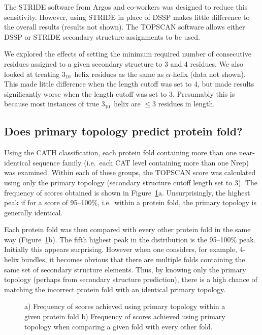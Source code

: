 \documentclass{article}
\newcommand{\htt}{\mbox{$3_{10}$}}
\begin{document}
The STRIDE software from Argos and co-workers was designed to reduce
this sensitivity. However, using STRIDE in place of DSSP makes little
difference to the overall results (results not shown). The TOPSCAN
software allows either DSSP or STRIDE secondary structure assignments
to be used.


We explored the effects of setting the minimum required number of
consecutive residues assigned to a given secondary structure to 3 and
4 residues. We also looked at treating \htt\ helix residues as the
same as $\alpha$-helix (data not shown). This made little difference
when the length cutoff was set to 4, but made results significantly
worse when the length cutoff was set to 3. Presumably this is because
most instances of true \htt\ helix are $\le 3$ residues in length.


\subsection{Does primary topology predict protein fold?}
Using the CATH classification, each protein fold containing more than
one near-identical sequence family (i.e.\ each CAT level containing
more than one Nrep) was examined. Within each of these groups, the
TOPSCAN score was calculated using only the primary topology
(secondary structure cutoff length set to 3). The frequency of scores
obtained is shown in Figure~\ref{fig:primary}a. Unsurprisingly, the
highest peak if for a score of 95--100\%, i.e.\ within a protein fold,
the primary topology is generally identical.

Each protein fold was then compared with every other protein fold in
the same way (Figure~\ref{fig:primary}b). The fifth highest peak in
the distribution is the 95--100\% peak. Initially this appears
surprising. However when one considers, for example, 4-helix bundles,
it becomes obvious that there are multiple folds containing the same
set of secondary structure elements. Thus, by knowing only the primary
topology (perhaps from secondary structure prediction), there is a
high chance of matching the incorrect protein fold with an identical
primary topology.


\begin{figure}
\caption{\label{fig:primary}a) Frequency of scores achieved using
primary topology within a given protein fold b) Frequency of scores
achieved using primary topology when comparing a given fold with every
other fold.}
\end{figure}
\end{document}
